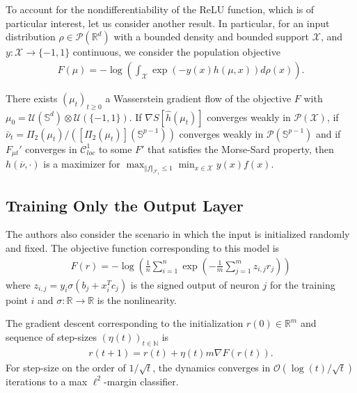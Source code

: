 \documentclass{article}
\newenvironment{manualtheorem}[1]{%
  \renewcommand\themanualtheoreminner{#1}%
  \manualtheoreminner
}{\endmanualtheoreminner}
\begin{document}
To account for the nondifferentiability of the ReLU function, which is of particular interest, let us consider another result. In particular, for an input distribution $\rho  \in \mathcal{P}(\mathbb{R}^d)$ with a bounded density and bounded support $\mathcal{X}$, and $y: \mathcal{X} \rightarrow \{ -1, 1\}$ continuous, we consider the population objective
\begin{align*}
    F(\mu) = -\log\left( \int_{\mathcal{X}} \exp\left(-y(x) h(\mu, x) \right) d \rho(x)\right).
\end{align*}

\begin{manualtheorem}{5}
There exists $(\mu_t)_{t \geq 0}$ a Wasserstein gradient flow of the objective $F$ with $\mu_0 = \mathcal{U}(\mathbb{S}^d)\otimes \mathcal{U}(\{-1,1\})$. If $\nabla S[\hat{h}(\mu_t)]$ converges weakly in $\mathcal{P}(\mathcal{X})$, if $\bar{\nu}_t = \Pi_2(\mu_t)/([\Pi_2(\mu_t)](\mathbb{S}^{p-1}))$ converges weakly in $\mathcal{P}(\mathbb{S}^{p-1})$ and if $F_{\mu t}'$ converges in $\mathcal{C}_{loc}^1$ to some $F'$ that satisfies the Morse-Sard property, then $h(\overbar{\nu}, \cdot)$ is a maximizer for $\max_{\Vert f \Vert_{\mathcal{F}_1} \leq 1} \min_{x \in \mathcal{X}} y(x)f(x)$.
\end{manualtheorem}

\subsection{Training Only the Output Layer}

The authors also consider the scenario in which the input is initialized randomly and fixed. The objective function corresponding to this model is
\begin{align*}
    F(r) = -\log\left( \frac{1}{n} \sum_{i=1}^n \exp\left( -\frac{1}{m} \sum_{j=1}^m z_{i,j} r_j\right) \right)
\end{align*}
where $z_{i,j} = y_i \sigma(b_j + x_i^Tc_j)$ is the signed output of neuron $j$ for the training point $i$ and $\sigma: \mathbb{R} \rightarrow \mathbb{R}$ is the nonlinearity.

The gradient descent corresponding to the initialization $r(0) \in 
\mathbb{R}^m$ and sequence of step-sizes $(\eta(t))_{t \in \mathbb{N}}$ is 
\begin{align*}
    r(t + 1) = r(t) + \eta(t)m \nabla F(r(t)).
\end{align*}
For step-size on the order of $1/\sqrt{t}$, the dynamics converges in $\mathcal{O}(\log(t)/\sqrt{t})$ iterations to a max $\ell^2$-margin classifier. 
\end{document}
